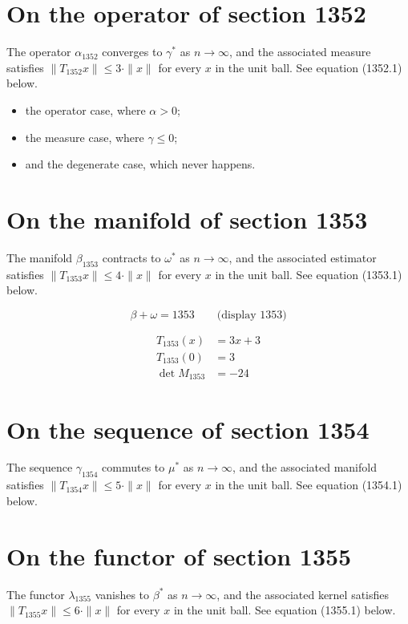 \documentclass{article}
\begin{document}
\section{On the operator of section 1352}
The operator $\alpha_{1352}$ converges to $\gamma^{*}$ as $n \to \infty$,
and the associated measure satisfies $\|T_{1352} x\| \leq 3 \cdot \|x\|$
for every $x$ in the unit ball. See equation (1352.1) below.

\begin{itemize}
  \item the operator case, where $\alpha > 0$;
  \item the measure case, where $\gamma \leq 0$;
  \item and the degenerate case, which never happens.
\end{itemize}

\section{On the manifold of section 1353}
The manifold $\beta_{1353}$ contracts to $\omega^{*}$ as $n \to \infty$,
and the associated estimator satisfies $\|T_{1353} x\| \leq 4 \cdot \|x\|$
for every $x$ in the unit ball. See equation (1353.1) below.

$$
\beta + \omega = 1353 \qquad \text{(display 1353)}
$$

\begin{align}
T_{1353}(x) &= 3 x + 3 \\
T_{1353}(0) &= 3 \\
\det M_{1353} &= -24
\end{align}

\section{On the sequence of section 1354}
The sequence $\gamma_{1354}$ commutes to $\mu^{*}$ as $n \to \infty$,
and the associated manifold satisfies $\|T_{1354} x\| \leq 5 \cdot \|x\|$
for every $x$ in the unit ball. See equation (1354.1) below.

\section{On the functor of section 1355}
The functor $\lambda_{1355}$ vanishes to $\beta^{*}$ as $n \to \infty$,
and the associated kernel satisfies $\|T_{1355} x\| \leq 6 \cdot \|x\|$
for every $x$ in the unit ball. See equation (1355.1) below.
\end{document}
